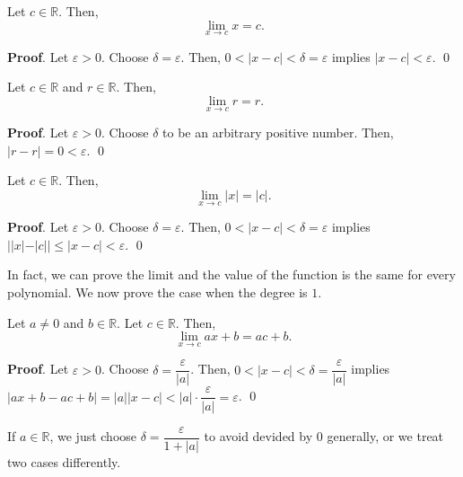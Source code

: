 \documentclass[11pt]{book}
\theoremstyle{break}
\theoremstyle{no_label}
\newcommand{\bbR}{\mathbb{R}}
\numberwithin{equation}{section}
\begin{document}
\begin{proposition}
    Let $c\in\bbR$. Then, $$\lim_{x\to c}x=c.$$
\end{proposition}
\textbf{Proof}. Let $\varepsilon>0$. Choose $\delta=\varepsilon$. Then, $0<|x-c|<\delta=\varepsilon$ implies $|x-c|<\varepsilon$. \qed

\begin{proposition}
    Let $c\in\bbR$ and $r\in\bbR$. Then, $$\lim_{x\to c}r=r.$$
\end{proposition}
\textbf{Proof}. Let $\varepsilon>0$. Choose $\delta$ to be an arbitrary positive number. Then, $|r-r|=0<\varepsilon$. \qed

\begin{proposition}
    Let $c\in\bbR$. Then, $$\lim_{x\to c}|x|=|c|.$$
\end{proposition}
\textbf{Proof}. Let $\varepsilon>0$. Choose $\delta=\varepsilon$. Then, $0<|x-c|<\delta=\varepsilon$ implies $||x|-|c||\leq|x-c|<\varepsilon$. \qed

In fact, we can prove the limit and the value of the function is the same for every polynomial. We now prove the case when the degree is $1$.

\begin{proposition}
    Let $a\ne 0$ and $b\in\bbR$. Let $c\in\bbR$. Then, $$\lim_{x\to c}ax+b=ac+b.$$
\end{proposition}
\textbf{Proof}. Let $\varepsilon>0$. Choose $\delta=\dfrac{\varepsilon}{|a|}$. Then, $0<|x-c|<\delta=\dfrac{\varepsilon}{|a|}$ implies $|ax+b-ac+b|=|a||x-c|<|a|\cdot\dfrac{\varepsilon}{|a|}=\varepsilon$. \qed

\begin{remark}
    If $a\in\bbR$, we just choose $\delta=\dfrac{\varepsilon}{1+|a|}$ to avoid devided by $0$ generally, or we treat two cases differently.
\end{remark}
\end{document}
